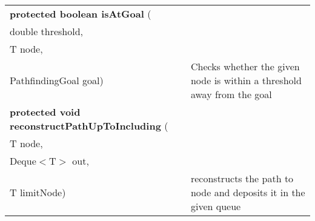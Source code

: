 {\begin{tabular}{ p{3in}|m{3.4in}}
\textbf{protected boolean isAtGoal } (\\ \hspace*{ 5pt} double threshold,\\\hspace*{ 5pt} T node,\\\hspace*{ 5pt} PathfindingGoal goal) & Checks whether the given node is within a threshold away from the goal\\ \hline 
\textbf{protected void reconstructPathUpToIncluding } (\\ \hspace*{ 5pt} T node,\\\hspace*{ 5pt} Deque$<$T$>$ out,\\\hspace*{ 5pt} T limitNode) & reconstructs the path to node and deposits it in the given queue\\ \hline 
\end{tabular}
}
